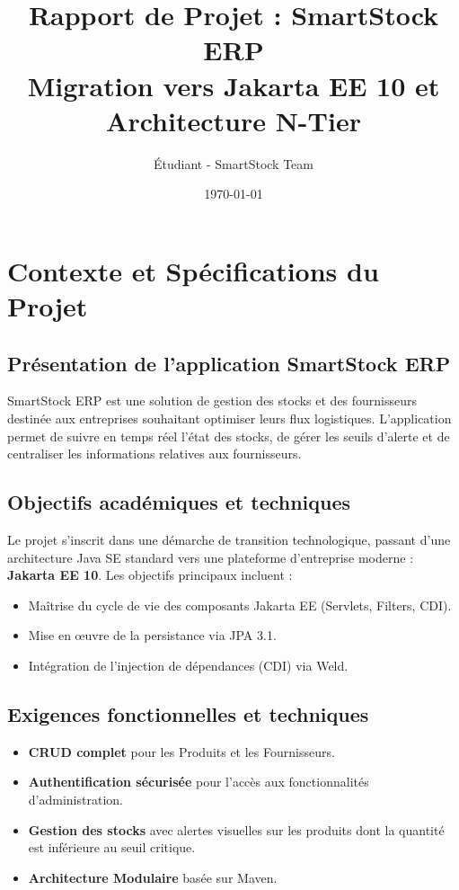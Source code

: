 \documentclass[12pt,a4paper]{report}
\title{Rapport de Projet : SmartStock ERP\\
\large Migration vers Jakarta EE 10 et Architecture N-Tier}
\author{Étudiant - SmartStock Team}
\date{\today}
\begin{document}
\maketitle
\tableofcontents

\chapter{Contexte et Spécifications du Projet}

\section{Présentation de l'application SmartStock ERP}
SmartStock ERP est une solution de gestion des stocks et des fournisseurs destinée aux entreprises souhaitant optimiser leurs flux logistiques. L'application permet de suivre en temps réel l'état des stocks, de gérer les seuils d'alerte et de centraliser les informations relatives aux fournisseurs.

\section{Objectifs académiques et techniques}
Le projet s'inscrit dans une démarche de transition technologique, passant d'une architecture Java SE standard vers une plateforme d'entreprise moderne : \textbf{Jakarta EE 10}. Les objectifs principaux incluent :
\begin{itemize}
    \item Maîtrise du cycle de vie des composants Jakarta EE (Servlets, Filters, CDI).
    \item Mise en œuvre de la persistance via JPA 3.1.
    \item Intégration de l'injection de dépendances (CDI) via Weld.
\end{itemize}

\section{Exigences fonctionnelles et techniques}
\begin{itemize}
    \item \textbf{CRUD complet} pour les Produits et les Fournisseurs.
    \item \textbf{Authentification sécurisée} pour l'accès aux fonctionnalités d'administration.
    \item \textbf{Gestion des stocks} avec alertes visuelles sur les produits dont la quantité est inférieure au seuil critique.
    \item \textbf{Architecture Modulaire} basée sur Maven.
\end{itemize}
\end{document}
